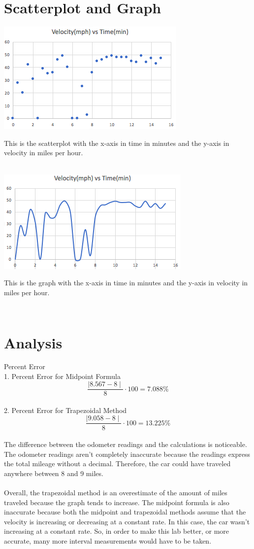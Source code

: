 \documentclass[12 pt]{article}
\begin{document}
\section{Scatterplot and Graph}
\includegraphics{scatter}
\begin{center}
    This is the scatterplot with the x-axis in time in minutes and the y-axis in velocity in miles per hour. 
\end{center}\\
\includegraphics{graph}
\begin{center}
    This is the graph with the x-axis in time in minutes and the y-axis in velocity in miles per hour. 
\end{center}\\
\section{Analysis}
Percent Error\\
1. Percent Error for Midpoint Formula\\
$$\frac{\mid8.567-8\mid}{8}\cdot100= 7.088\%$$\\
2. Percent Error for Trapezoidal Method
$$\frac{\mid9.058-8\mid}{8}\cdot100= 13.225\%$$\\
The difference between the odometer readings and the calculations is noticeable. The odometer readings aren't completely inaccurate because the readings express the total mileage without a decimal. Therefore, the car could have traveled anywhere between 8 and 9 miles.\\\\
Overall, the trapezoidal method is an overestimate of the amount of miles traveled because the graph tends to increase. The midpoint formula is also inaccurate because both the midpoint and trapezoidal methods assume that the velocity is increasing or decreasing at a constant rate. In this case, the car wasn't increasing at a constant rate. So, in order to make this lab better, or more accurate, many more interval measurements would have to be taken.
\end{document}
